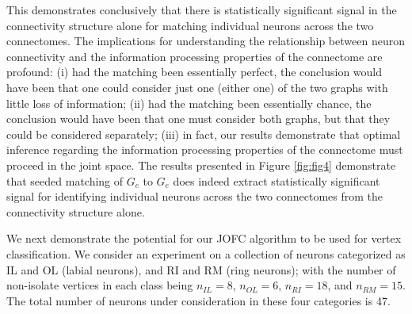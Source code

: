 \documentclass[12pt]{article}
\numberwithin{equation}{section}
\theoremstyle{definition}
\begin{document}
This demonstrates conclusively that there is statistically significant signal in the connectivity structure alone for matching individual neurons across the two connectomes.
The implications for understanding the relationship between neuron connectivity and the information processing properties of the connectome are profound: (i) had the
matching been essentially perfect, the conclusion would have been that one could consider just one
(either one) of the two graphs with little loss of information; (ii) had the matching been essentially
chance, the conclusion would have been that one must consider both graphs, but that they could
be considered separately; (iii) in fact, our results demonstrate that optimal inference regarding the
information processing properties of the connectome must proceed in the joint space.
The results presented in Figure \ref{fig:fig4} demonstrate that seeded matching of $G_c$
to $G_e$ does indeed extract statistically significant signal for identifying individual neurons
across the two connectomes from the connectivity structure alone.

We next demonstrate the potential for our JOFC algorithm to be used for vertex classification.  We consider an experiment
on a collection of neurons categorized as IL and OL (labial neurons), and RI and RM (ring neurons); with the number of non-isolate vertices in each class being $n_{IL} = 8$, $n_{OL} = 6$, $n_{RI} = 18$, and $n_{RM} = 15$.  The total number of neurons under consideration in these four categories is 47.
\end{document}
